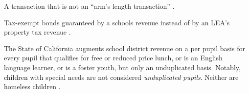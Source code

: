 \begin{description}[nosep]
  \medskip\item[related party transaction] A transaction that is not an ``arm's length transaction'' \parencite{Kenton2022}.

  \medskip\item[revenue bonds] Tax-exempt bonds guaranteed by a schools revenue instead of by an LEA's property tax revenue \parencite{Chen2021}.

  \medskip\item[unduplicated pupils] The State of California augments school district revenue on a per pupil basis for every pupil that qualifies for free or reduced price lunch, or is an English language learner, or is a foster youth, but only an unduplicated basis. Notably, children with special needs are not considered \textit{unduplicated pupils}. Neither are homeless children \parencite{CDE2015}.

\end{description}

